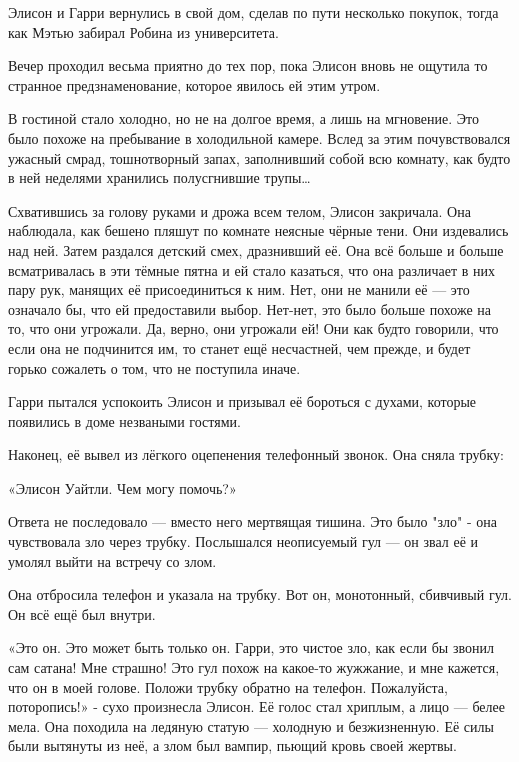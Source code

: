 \documentclass[a4paper,12pt]{book}
\begin{document}
\par
Элисон и Гарри вернулись в свой дом, сделав по пути несколько покупок, тогда как Мэтью забирал Робина из университета.
\par
Вечер проходил весьма приятно до тех пор, пока Элисон вновь не ощутила то странное предзнаменование, которое явилось ей этим утром.
\par
В гостиной стало холодно, но не на долгое время, а лишь на мгновение. Это было похоже на пребывание в холодильной камере. Вслед за этим почувствовался ужасный смрад, тошнотворный запах, заполнивший собой всю комнату, как будто в ней неделями хранились полусгнившие трупы…
\par
Схватившись за голову руками и дрожа всем телом, Элисон закричала. Она наблюдала, как бешено пляшут по комнате неясные чёрные тени. Они издевались над ней. Затем раздался детский смех, дразнивший её. Она всё больше и больше всматривалась в эти тёмные пятна и ей стало казаться, что она различает в них пару рук, манящих её присоединиться к ним. Нет, они не манили её — это означало бы, что ей предоставили выбор. Нет-нет, это было больше похоже на то, что они угрожали. Да, верно, они угрожали ей! Они как будто говорили, что если она не подчинится им, то станет ещё несчастней, чем прежде, и будет горько сожалеть о том, что не поступила иначе.
\par
Гарри пытался успокоить Элисон и призывал её бороться с духами, которые появились в доме незваными гостями.
\par
Наконец, её вывел из лёгкого оцепенения телефонный звонок. Она сняла трубку:\\
\par
«Элисон Уайтли. Чем могу помочь?»\\
\par
Ответа не последовало — вместо него мертвящая тишина. Это было "зло" - она чувствовала зло через трубку. Послышался неописуемый гул — он звал её и умолял выйти на встречу со злом.
\par
Она отбросила телефон и указала на трубку. Вот он, монотонный, сбивчивый гул. Он всё ещё был внутри.
\par
«Это он. Это может быть только он. Гарри, это чистое зло, как если бы звонил сам сатана! Мне страшно! Это гул похож на какое-то жужжание, и мне кажется, что он в моей голове. Положи трубку обратно на телефон. Пожалуйста, поторопись!» - сухо произнесла Элисон. Её голос стал хриплым, а лицо — белее мела. Она походила на ледяную статую — холодную и безжизненную. Её силы были вытянуты из неё, а злом был вампир, пьющий кровь своей жертвы.
\end{document}
